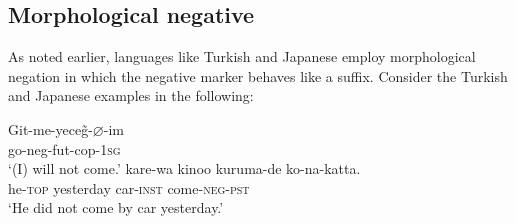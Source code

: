 \documentclass[output=paper
                ,modfonts
                ,nonflat
	        ,collection
	        ,collectionchapter
	        ,collectiontoclongg
 	        ,biblatex
                ,babelshorthands
                ,newtxmath
                ,draftmode
                ,colorlinks, citecolor=brown
]{./langsci/langscibook}
\begin{document}
{\begin{exe}
\begin{xlist}
\begin{exe}
\begin{xlist}

%

\section{Morphological negative}

As noted earlier, languages like Turkish and Japanese employ morphological negation in which the negative marker behaves like a suffix. Consider
the Turkish and Japanese examples in the following:

\eal
\ex
\label{negation-turkish-jap}
\gll Git-me-yece\~{g}-$\varnothing$-im \\
     go-{\sc neg-fut-cop}-\textsc{1sg} \\
\glt `(I) will not come.'
\ex
\gll kare-wa kinoo kuruma-de ko-na-katta. \\
     he-\textsc{top} yesterday car-\textsc{inst} come-\textsc{neg}-\textsc{pst} \\
\glt `He did not come by car yesterday.'
\zl


\end{xlist}
\end{exe}
\end{xlist}
\end{exe}}
\end{document}
